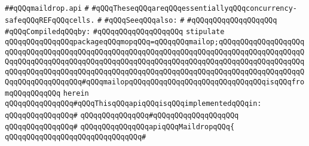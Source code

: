 \label{src/lib/src/lib/thread-kit/src/core-thread-kit/maildrop.api}
\verb|##qQQqmaildrop.api|\newline
\verb|#|\newline
\verb|#qQQqTheseqQQqareqQQqessentiallyqQQqconcurrency-safeqQQqREFqQQqcells.|\newline
\verb|#|\newline
\verb|#qQQqSeeqQQqalso:|\newline
\verb|#|\newline
\verb|#qQQqqQQqqQQqqQQqqQQq|\newline
\newline
\verb|#qQQqCompiledqQQqby:|\newline
\verb|#qQQqqQQqqQQqqQQqqQQq|\newline
\newline
\newline
\newline
\newline
\newline
\verb|stipulate|\newline
\verb|qQQqqQQqqQQqqQQqpackageqQQqmopqQQq=qQQqqQQqmailop;qQQqqQQqqQQqqQQqqQQqqQQqqQQqqQQqqQQqqQQqqQQqqQQqqQQqqQQqqQQqqQQqqQQqqQQqqQQqqQQqqQQqqQQqqQQqqQQqqQQqqQQqqQQqqQQqqQQqqQQqqQQqqQQqqQQqqQQqqQQqqQQqqQQqqQQqqQQqqQQqqQQqqQQqqQQqqQQqqQQqqQQqqQQqqQQqqQQqqQQqqQQqqQQqqQQqqQQqqQQqqQQqqQQqqQQqqQQqqQQqqQQqqQQq#qQQqmailopqQQqqQQqqQQqqQQqqQQqqQQqqQQqqQQqisqQQqfromqQQqqQQqqQQq|\newline
\verb|herein|\newline
\newline
\verb|qQQqqQQqqQQqqQQq#qQQqThisqQQqapiqQQqisqQQqimplementedqQQqin:|\newline
\verb|qQQqqQQqqQQqqQQq#|\newline
\verb|qQQqqQQqqQQqqQQq#qQQqqQQqqQQqqQQqqQQq|\newline
\verb|qQQqqQQqqQQqqQQq#|\newline
\verb|qQQqqQQqqQQqqQQqapiqQQqMaildropqQQq{|\newline
\verb|qQQqqQQqqQQqqQQqqQQqqQQqqQQqqQQq#|\newline
